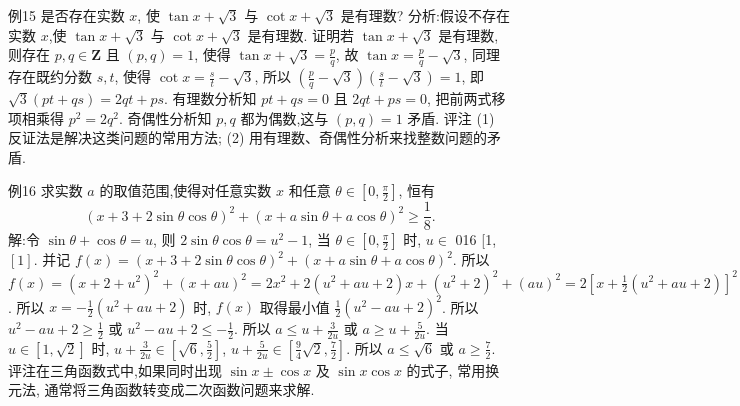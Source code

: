 例15 是否存在实数 $x$, 使 $\tan x+\sqrt{3}$ 与 $\cot x+\sqrt{3}$ 是有理数?
分析:假设不存在实数 $x$,使 $\tan x+\sqrt{3}$ 与 $\cot x+\sqrt{3}$ 是有理数.
证明若 $\tan x+\sqrt{3}$ 是有理数,则存在 $p, q \in \mathbf{Z}$ 且 $(p, q)=1$, 使得 $\tan x+ \sqrt{3}=\frac{p}{q}$, 故 $\tan x=\frac{p}{q}-\sqrt{3}$, 同理存在既约分数 $s, t$, 使得 $\cot x=\frac{s}{t}-\sqrt{3}$, 所以 $\left(\frac{p}{q}-\sqrt{3}\right)\left(\frac{s}{t}-\sqrt{3}\right)=1$, 即 $\sqrt{3}(p t+q s)=2 q t+p s$.
有理数分析知 $p t+q s=0$ 且 $2 q t+p s=0$, 把前两式移项相乘得 $p^2=2 q^2$. 奇偶性分析知 $p, q$ 都为偶数,这与 $(p, q)=1$ 矛盾.
评注 (1) 反证法是解决这类问题的常用方法; (2) 用有理数、奇偶性分析来找整数问题的矛盾.



例16 求实数 $a$ 的取值范围,使得对任意实数 $x$ 和任意 $\theta \in\left[0, \frac{\pi}{2}\right]$, 恒有
$$
(x+3+2 \sin \theta \cos \theta)^2+(x+a \sin \theta+a \cos \theta)^2 \geqslant \frac{1}{8} .
$$
解:令 $\sin \theta+\cos \theta=u$, 则 $2 \sin \theta \cos \theta=u^2-1$, 当 $\theta \in\left[0, \frac{\pi}{2}\right]$ 时, $u \in$ 016 [1, $[1]$.
并记 $f(x)=(x+3+2 \sin \theta \cos \theta)^2+(x+a \sin \theta+a \cos \theta)^2$.
所以 $f(x)=\left(x+2+u^2\right)^2+(x+a u)^2=2 x^2+2\left(u^2+a u+2\right) x+ \left(u^2+2\right)^2+(a u)^2=2\left[x+\frac{1}{2}\left(u^2+a u+2\right)\right]^2+\frac{1}{2}\left(u^2-a u+2\right)^2$.
所以 $x=-\frac{1}{2}\left(u^2+a u+2\right)$ 时, $f(x)$ 取得最小值 $\frac{1}{2}\left(u^2-a u+2\right)^2$. 所以 $u^2-a u+2 \geqslant \frac{1}{2}$ 或 $u^2-a u+2 \leqslant-\frac{1}{2}$.
所以 $a \leqslant u+\frac{3}{2 u}$ 或 $a \geqslant u+\frac{5}{2 u}$. 当 $u \in[1, \sqrt{2}]$ 时, $u+\frac{3}{2 u} \in\left[\sqrt{6}, \frac{5}{2}\right]$, $u+\frac{5}{2 u} \in\left[\frac{9}{4} \sqrt{2}, \frac{7}{2}\right]$.
所以 $a \leqslant \sqrt{6}$ 或 $a \geqslant \frac{7}{2}$.
评注在三角函数式中,如果同时出现 $\sin x \pm \cos x$ 及 $\sin x \cos x$ 的式子, 常用换元法, 通常将三角函数转变成二次函数问题来求解.




